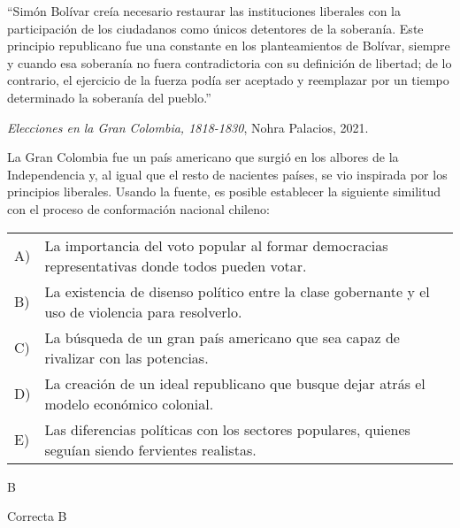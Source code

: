 \documentclass[letterpaper,11pt]{article}
\newcommand{\anchopregunta}{0.9\textwidth}
\begin{document}
\begin{enumerate}
\begin{minipage}{\anchopregunta}
\item ``Simón Bolívar creía necesario restaurar las instituciones liberales con la participación de los ciudadanos como únicos detentores de la soberanía. Este principio republicano fue una constante en los planteamientos de Bolívar, siempre y cuando esa soberanía no fuera contradictoria con su definición de libertad; de lo contrario, el ejercicio de la fuerza podía ser aceptado y reemplazar por un tiempo determinado la soberanía del pueblo.''\\
\begin{flushright}
\textit{Elecciones en la Gran Colombia, 1818-1830}, Nohra Palacios, 2021.
\end{flushright}
La Gran Colombia fue un país americano que surgió en los albores de la Independencia y, al igual que el resto de nacientes países, se vio inspirada por los principios liberales. Usando la fuente, es posible establecer la siguiente similitud con el proceso de conformación nacional chileno: \\
\begin{flushleft}\begin{tabular}{@{\hspace{-.001\textwidth}}l@{\hspace{2pt}}p{}}
A)& La importancia del voto popular al formar democracias representativas donde todos pueden votar.\\
B)& La existencia de disenso político entre la clase gobernante y el uso de violencia para resolverlo.\\
C)& La búsqueda de un gran país americano que sea capaz de rivalizar con las potencias.\\
D)& La creación de un ideal republicano que busque dejar atrás el modelo económico colonial.\\
E)& Las diferencias políticas con los sectores populares, quienes seguían siendo fervientes realistas.\\ 
\end{tabular}\end{flushleft}%
\begin{key} B
\end{key} 
\begin{hint}
\end{hint}
\begin{answer} Correcta B \\
\end{answer}
\begin{info} %

\end{info}
\end{minipage}
\end{enumerate}
\end{document}
